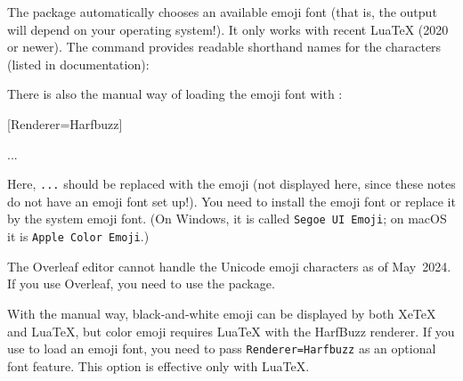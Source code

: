 The  package automatically chooses an available emoji font
(that is, the output will depend on your operating system!).
It only works with recent LuaTeX (2020 or newer).
The command provides readable shorthand names for the characters (listed in documentation):
%
\begin{ExampleCode}
\usepackage{emoji}

\end{ExampleCode}

There is also the manual way of loading the emoji font with :
%
\begin{ExampleCode}
\usepackage{fontspec}
[Renderer=Harfbuzz]

{\emojifont ...}
\end{ExampleCode}
%
Here, \verb|...| should be replaced with the emoji
(not displayed here, since these notes do not have an emoji font set up!).
You need to install the emoji font or replace it by the system emoji font.
(On Windows, it is called \texttt{Segoe UI Emoji};
on macOS it is \texttt{Apple Color Emoji}.)

\begin{overleaf}
The Overleaf editor cannot handle the Unicode emoji characters as of May~2024.
If you use Overleaf, you need to use the  package.
\end{overleaf}

\begin{warning}
With the manual way, black-and-white emoji can be displayed by both XeTeX and LuaTeX,
but color emoji requires LuaTeX with the HarfBuzz renderer.
If you use  to load an emoji font,
you need to pass \verb|Renderer=Harfbuzz| as an optional font feature.
This option is effective only with LuaTeX.
\end{warning}
